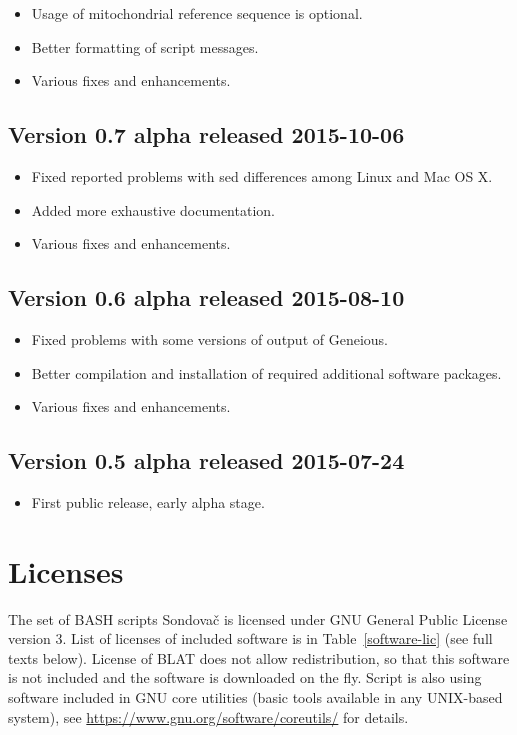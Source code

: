 \documentclass[a4paper, 11pt, twoside]{article}
\begin{document}
\begin{itemize}
  \item Usage of mitochondrial reference sequence is optional.
  \item Better formatting of script messages.
  \item Various fixes and enhancements.
\end{itemize}

\subsection{Version 0.7 alpha released 2015-10-06}

\begin{itemize}
  \item Fixed reported problems with sed differences among Linux and Mac OS X.
  \item Added more exhaustive documentation.
  \item Various fixes and enhancements.
\end{itemize}

\subsection{Version 0.6 alpha released 2015-08-10}

\begin{itemize}
  \item Fixed problems with some versions of output of Geneious.
  \item Better compilation and installation of required additional software packages.
  \item Various fixes and enhancements.
\end{itemize}

\subsection{Version 0.5 alpha released 2015-07-24}

\begin{itemize}
  \item First public release, early alpha stage.
\end{itemize}

\section{Licenses}

The set of BASH scripts Sondovač is licensed under GNU General Public License version 3. List of licenses of included software is in Table~\ref{software-lic} (see full texts below). License of BLAT does not allow redistribution, so that this software is not included and the software is downloaded on the fly. Script is also using software included in GNU core utilities (basic tools available in any UNIX-based system), see \url{https://www.gnu.org/software/coreutils/} for details.
\end{document}
